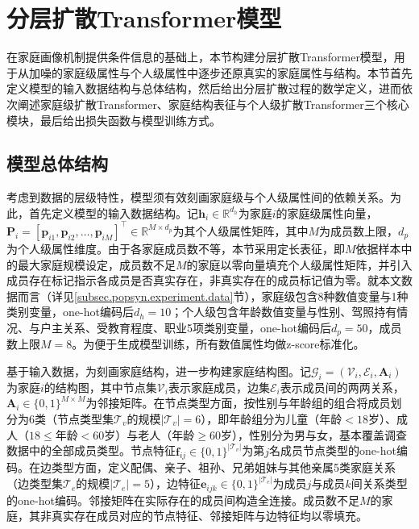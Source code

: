 \section{分层扩散Transformer模型}\label{sec.popsyn.model}
 
在家庭画像机制提供条件信息的基础上，本节构建分层扩散Transformer模型，用于从加噪的家庭级属性与个人级属性中逐步还原真实的家庭属性与结构。本节首先定义模型的输入数据结构与总体结构，然后给出分层扩散过程的数学定义，进而依次阐述家庭级扩散Transformer、家庭结构表征与个人级扩散Transformer三个核心模块，最后给出损失函数与模型训练方式。
 
\subsection{模型总体结构}\label{subsec.popsyn.model.framework}
 
考虑到数据的层级特性，模型须有效刻画家庭级与个人级属性间的依赖关系。为此，首先定义模型的输入数据结构。记$\mathbf{h}_i \in \mathbb{R}^{d_h}$为家庭$i$的家庭级属性向量，$\mathbf{P}_i = [\mathbf{p}_{i1}, \mathbf{p}_{i2}, \ldots, \mathbf{p}_{iM}]^\top \in \mathbb{R}^{M \times d_p}$为其个人级属性矩阵，其中$M$为成员数上限，$d_p$为个人级属性维度。由于各家庭成员数不等，本节采用定长表征，即$M$依据样本中的最大家庭规模设定，成员数不足$M$的家庭以零向量填充个人级属性矩阵，并引入成员存在标记指示各成员是否真实存在，非真实存在的成员标记值为零。就本文数据而言（详见\ref{subsec.popsyn.experiment.data}节），家庭级包含8种数值变量与1种类别变量，one-hot编码后$d_h = 10$；个人级包含年龄数值变量与性别、驾照持有情况、与户主关系、受教育程度、职业5项类别变量，one-hot编码后$d_p = 50$，成员数上限$M = 8$。为便于生成模型训练，所有数值属性均做z-score标准化。
 
基于输入数据，为刻画家庭结构，进一步构建家庭结构图。记$\mathcal{G}_i = (\mathcal{V}_i, \mathcal{E}_i, \mathbf{A}_i)$为家庭$i$的结构图，其中节点集$\mathcal{V}_i$表示家庭成员，边集$\mathcal{E}_i$表示成员间的两两关系，$\mathbf{A}_i \in \{0, 1\}^{M \times M}$为邻接矩阵。在节点类型方面，按性别与年龄组的组合将成员划分为6类（节点类型集$\mathcal{T}_v$的规模$|\mathcal{T}_v| = 6$），即年龄组分为儿童（年龄$<18$岁）、成人（$18 \leq$年龄$< 60$岁）与老人（年龄$\geq 60$岁），性别分为男与女，基本覆盖调查数据中的全部成员类型。节点特征$\mathbf{f}_{ij} \in \{0, 1\}^{|\mathcal{T}_v|}$为第$j$名成员节点类型的one-hot编码。在边类型方面，定义配偶、亲子、祖孙、兄弟姐妹与其他亲属5类家庭关系（边类型集$\mathcal{T}_e$的规模$|\mathcal{T}_e| = 5$），边特征$\mathbf{e}_{ijk} \in \{0, 1\}^{|\mathcal{T}_e|}$为成员$j$与成员$k$间关系类型的one-hot编码。邻接矩阵在实际存在的成员间构造全连接。成员数不足$M$的家庭，其非真实存在成员对应的节点特征、邻接矩阵与边特征均以零填充。
 
